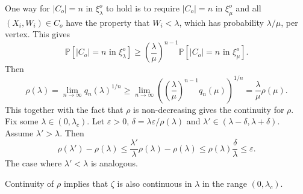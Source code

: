 \documentclass[a4paper,12pt]{scrartcl}
\renewcommand{\P}{\mathbb{P}}
\newcommand{\eps}{\varepsilon}
\theoremstyle{definition}
\theoremstyle{remark}
\begin{document}
  One way for $|C_o|=n$ in $\xi^o_{\lambda}$ to hold is to require $|C_o|=n$ in $\xi^o_{\mu}$ and all $(X_i, W_i)\in C_o$ have the property that $W_i<\lambda$, which has probability $\lambda/\mu$, per vertex.
  This gives
  \begin{equation}
    \P[|C_o|=n \text{ in } \xi^o_{\lambda}]
    \geq
    (\frac\lambda\mu)^{n-1}
    \P[|C_o|=n \text{ in } \xi^o_{\mu}].
  \end{equation}
  Then
  $$
  \rho(\lambda)
  =
  \lim_{n\to\infty} q_n(\lambda)^{1/n}
  \geq
  \lim_{n\to\infty} ((\frac\lambda\mu)^{n-1} q_n(\mu))^{1/n}
  =
  \frac\lambda\mu \rho(\mu).
  $$
  This together with the fact that $\rho$ is non-decreasing gives the continuity for $\rho$. Fix some $\lambda\in(0,\lambda_c)$. Let $\eps>0$, $\delta = \lambda\eps/{\rho(\lambda)}$ and $\lambda'\in (\lambda-\delta, \lambda + \delta)$. Assume $\lambda' > \lambda$. Then
  $$
  \rho(\lambda')-\rho(\lambda)
  \leq
  \frac{\lambda'}\lambda \rho (\lambda) - \rho(\lambda)
  \leq \rho(\lambda)\frac{\delta}{\lambda}
  \leq \eps.
  $$
  The case where $\lambda'<\lambda$ is analogous.

  Continuity of $\rho$ implies that $\zeta$ is also continuous in $\lambda$ in the range $(0,\lambda_c)$.
\end{document}
